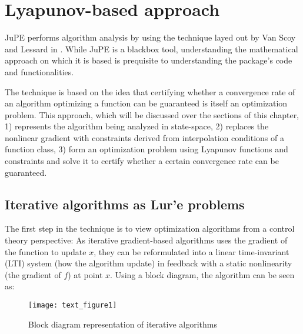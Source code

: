 \chapter{Lyapunov-based approach}

JuPE performs algorithm analysis by using the technique layed out by Van Scoy and Lessard in \cite{tutorial}. While JuPE is a blackbox tool, understanding the mathematical approach on which it is based is prequisite to understanding the package's code and functionalities.

The technique is based on the idea that certifying whether a convergence rate of an algorithm optimizing a function can be guaranteed is itself an optimization problem. This approach, which will be discussed over the sections of this chapter, 1) represents the algorithm being analyzed in state-space, 2) replaces the nonlinear gradient with constraints derived from interpolation conditions of a function class, 3) form an optimization problem using Lyapunov functions and constraints and solve it to certify whether a certain convergence rate can be guaranteed.
\section{Iterative algorithms as Lur'e problems}

The first step in the technique is to view optimization algorithms from a control theory perspective: As iterative gradient-based algorithms uses the gradient of the function to update \(x\), they can be reformulated into a linear time-invariant (LTI) system (how the algorithm update) in feedback with a static nonlinearity (the gradient of \(f\)) at point \(x\). Using a block diagram, the algorithm can be seen as:

\begin{figure}[h]
    \centering
	\texttt{[image: text\_figure1]}
    \caption{Block diagram representation of iterative algorithms}
    \label{plot_block_diagram}
\end{figure}

